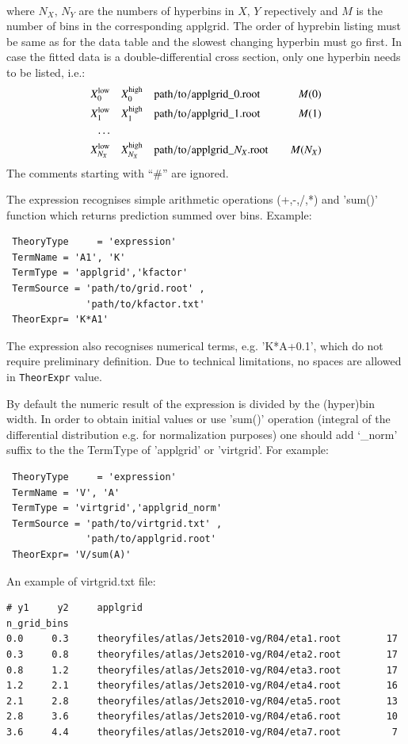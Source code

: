 \begin{description}
\begin{align*}
  \end{align*}
  where \(N_X,\,N_Y\) are the numbers of hyperbins in \(X,\,Y\) repectively and
  \(M\) is the number of bins in the corresponding applgrid. The order of hyprebin
  listing must be same as for the data table and the slowest changing hyperbin 
  must go first. In case the fitted data is a double-differential cross section, only 
  one hyperbin needs to be listed, i.e.:
  \begin{align*}
  X_0^{\mathrm{low}} &\quad X_0^{\mathrm{high}} \quad { \mathrm{path/to/applgrid}}\_0{\mathrm{.root}} &\quad M(0) \\
  X_1^{\mathrm{low}} &\quad X_1^{\mathrm{high}} \quad { \mathrm{path/to/applgrid}}\_1{\mathrm{.root}} &\quad M(1) \\
  \ldots \\
  X_{N_X}^{\mathrm{low}} &\quad X_{N_X}^{\mathrm{high}} \quad { \mathrm{path/to/applgrid}}\_N_X{\mathrm{.root}} &\quad M(N_X) \\
  \end{align*}
  The comments starting with ``\#'' are ignored.
\end{description}
The expression recognises simple arithmetic operations
(+,-,/,*) and 'sum()' function which returns prediction summed over bins.
Example:
\begin{verbatim}
 TheoryType     = 'expression'
 TermName = 'A1', 'K'
 TermType = 'applgrid','kfactor'
 TermSource = 'path/to/grid.root' ,
              'path/to/kfactor.txt'
 TheorExpr= 'K*A1'
\end{verbatim}
The expression also recognises numerical terms, e.g.  'K*A+0.1', which do not
require preliminary definition. Due to technical limitations, no spaces are
allowed in {\tt TheorExpr} value. 

By default the numeric result of the expression is divided by the (hyper)bin
width. In order to obtain initial values or use 'sum()' operation (integral of
the differential distribution e.g. for normalization purposes) one should add
`\_norm' suffix to the the TermType of 'applgrid' or 'virtgrid'. For example: 
\begin{verbatim}
 TheoryType     = 'expression'
 TermName = 'V', 'A'
 TermType = 'virtgrid','applgrid_norm'
 TermSource = 'path/to/virtgrid.txt' ,
              'path/to/applgrid.root'
 TheorExpr= 'V/sum(A)'
\end{verbatim}

An example of virtgrid.txt file:
\begin{verbatim}
# y1     y2     applgrid                                        n_grid_bins
0.0     0.3     theoryfiles/atlas/Jets2010-vg/R04/eta1.root        17
0.3     0.8     theoryfiles/atlas/Jets2010-vg/R04/eta2.root        17
0.8     1.2     theoryfiles/atlas/Jets2010-vg/R04/eta3.root        17
1.2     2.1     theoryfiles/atlas/Jets2010-vg/R04/eta4.root        16
2.1     2.8     theoryfiles/atlas/Jets2010-vg/R04/eta5.root        13
2.8     3.6     theoryfiles/atlas/Jets2010-vg/R04/eta6.root        10
3.6     4.4     theoryfiles/atlas/Jets2010-vg/R04/eta7.root         7
\end{verbatim}


